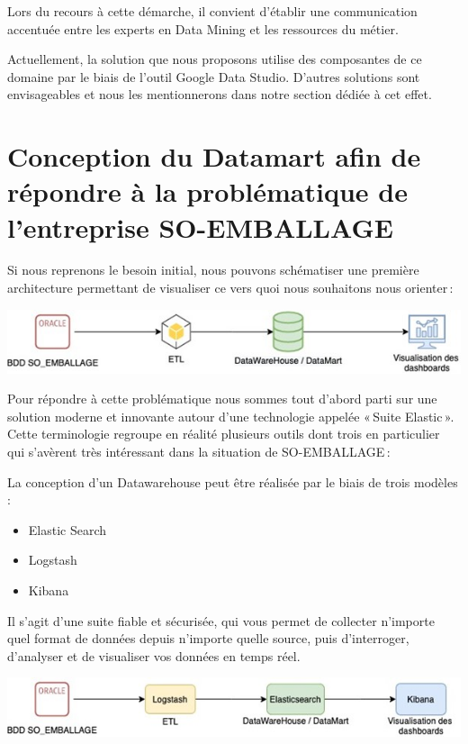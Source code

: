 Lors du recours à cette démarche, il convient d’établir une communication accentuée entre les experts en Data Mining et les ressources du métier.   \vertspace 

Actuellement, la solution que nous proposons utilise des composantes de ce domaine par le biais de l’outil Google Data Studio. D’autres solutions sont envisageables et nous les mentionnerons dans notre section dédiée à cet effet. 

\newpage

\section{Conception du Datamart afin de répondre à la problématique de l’entreprise SO-EMBALLAGE}  

Si nous reprenons le besoin initial, nous pouvons schématiser une première architecture permettant de visualiser ce vers quoi nous souhaitons nous orienter : 

\begin{center}
	\includegraphics[scale=0.86]{images/solution_generale.jpg} 
\end{center}  

Pour répondre à cette problématique nous sommes tout d’abord parti sur une solution moderne et innovante autour d’une technologie appelée « Suite Elastic ». Cette terminologie regroupe en réalité plusieurs outils dont trois en particulier qui s’avèrent très intéressant dans la situation de SO-EMBALLAGE :  

La conception d’un Datawarehouse peut être réalisée par le biais de trois modèles : 
\begin{itemize}[label=\textbullet, font=\LARGE \color{listGreen}]
	\item Elastic Search
	\item Logstash 
	\item Kibana 
\end{itemize} 

Il s'agit d'une suite fiable et sécurisée, qui vous permet de collecter n'importe quel format de données depuis n'importe quelle source, puis d'interroger, d'analyser et de visualiser vos données en temps réel.  

\begin{center}
	\includegraphics[scale=0.86]{images/solution.jpg} 
\end{center}  

